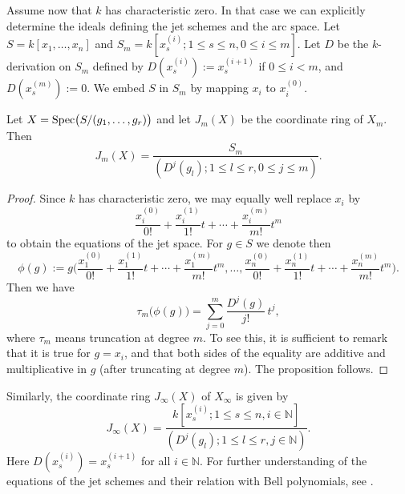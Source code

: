 Assume now that $k$ has characteristic zero. In that case we can explicitly determine the ideals defining the jet schemes and the arc space. Let $S=k[x_1, \ldots ,x_n]$ and
$S_{m}=k[x_s^{(i)}; 1\leq s \leq n, 0\leq i\leq m]$. Let $D$ be the $k$-derivation on $S_m$ defined by $D(x_s^{(i)}):= x_s^{(i+1)}$ if $0\leq i <m$, and $D(x_s^{(m)}):= 0$. We embed $S$ in $S_m$ by mapping $x_i$ to $x_i^{(0)}$.

\begin{Prop}\label{prop:equations_by_deriving} 
Let $X=\operatorname{Spec}\bigl(S/(g_1, \ldots ,g_r)\bigr)$ and let $J_m(X)$ be the coordinate ring of $X_m$. Then
$$J_m(X) = \frac{S_m}{(D^j(g_l) ; 1\leq l\leq r, 0\leq j\leq m)}.$$
\end{Prop}
 
\begin{proof}
Since $k$ has characteristic zero, we may equally well replace $x_i$ by
\[ \frac{x_i^{(0)}}{0!} + \frac{x_i^{(1)}}{1!} t + \cdots + \frac{x_i^{(m)}}{m!} t^m \]
to obtain the equations of the jet space. For $g\in S$ we denote then
\[ \phi(g) := g\biggl( \frac{x_1^{(0)}}{0!} + \frac{x_1^{(1)}}{1!} t + \cdots + \frac{x_1^{(m)}}{m!} t^m ,\ldots , \frac{x_n^{(0)}}{0!} + \frac{x_n^{(1)}}{1!} t + \cdots + \frac{x_n^{(m)}}{m!} t^m \biggr).\]
Then we have
$$ \tau_m\bigl(\phi(g)\bigr) = \sum_{j=0}^m \frac{D^j(g)}{j!}\, t^j,$$
where $\tau_m$ means truncation at degree $m$. To see this, it is sufficient to remark that it is true for $g=x_i$, and that both sides of the
equality are additive and multiplicative in $g$ (after truncating at degree $m$). The proposition follows.
\end{proof}

Similarly, the coordinate ring $J_{\infty}(X)$ of $X_{\infty}$ is given by 
\[ J_{\infty}(X) = \frac{k[x_s^{(i)}; 1\leq s \leq n, i\in \mathbb{N}]}{(D^j(g_l) ; 1\leq l\leq r, j\in \mathbb{N})} .\] 
Here $D(x_s^{(i)}) = x_s^{(i+1)}$ for all $i\in \mathbb{N}$. For further understanding of the equations of the jet schemes and their relation with Bell polynomials, see \cite{bruschek_thesis,bruschek_JetAndBell}.